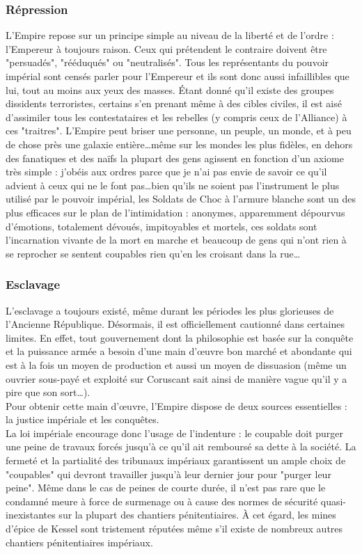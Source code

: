 \documentclass[twoside]{article}
\begin{document}
\subsubsection{Répression}
L'Empire repose sur un principe simple au niveau de la liberté et de l'ordre : l'Empereur à toujours raison. Ceux qui prétendent le contraire doivent être "persuadés", "rééduqués" ou "neutralisés". Tous les représentants du pouvoir impérial sont censés parler pour l'Empereur et ils sont donc aussi infaillibles que lui, tout au moins aux yeux des masses. Étant donné qu'il existe des groupes dissidents terroristes, certains s'en prenant même à des cibles civiles, il est aisé d'assimiler tous les contestataires et les rebelles (y compris ceux de l'Alliance) à ces "traitres". L'Empire peut briser une personne, un peuple, un monde, et à peu de chose près une galaxie entière\ldots même sur les mondes les plus fidèles, en dehors des fanatiques et des naïfs la plupart des gens agissent en fonction d'un axiome très simple : j'obéis aux ordres parce que je n'ai pas envie de savoir ce qu'il advient à ceux qui ne le font pas\ldots bien qu'ils ne soient pas l'instrument le plus utilisé par le pouvoir impérial,  les Soldats de Choc à l'armure blanche sont un des plus efficaces sur le plan de l'intimidation : anonymes, apparemment dépourvus d'émotions, totalement dévoués, impitoyables et mortels, ces soldats sont l'incarnation vivante de la mort en marche et beaucoup de gens qui n'ont rien à se reprocher se sentent coupables rien qu'en les croisant dans la rue\ldots

\subsubsection{Esclavage}
L'esclavage a toujours existé, même durant les périodes les plus glorieuses de l'Ancienne République. Désormais, il est officiellement cautionné dans certaines limites. En effet, tout gouvernement dont la philosophie est basée sur la conquête et la puissance armée a besoin d'une main d'\oe uvre bon marché et abondante qui est à la fois un moyen de production et aussi un moyen de dissuasion (même un ouvrier sous-payé et exploité sur Coruscant sait ainsi de manière vague qu'il y a pire que son sort\ldots).\\

Pour obtenir cette main d'\oe uvre, l'Empire dispose de deux sources essentielles : la justice impériale et les conquêtes.\\

La loi impériale encourage donc l'usage de l'indenture : le coupable doit purger une peine de travaux forcés jusqu'à ce qu'il ait remboursé sa dette à la société. La fermeté et la partialité des tribunaux impériaux garantissent un ample choix de "coupables" qui devront travailler jusqu'à leur dernier jour pour "purger leur peine". Même dans le cas de peines de courte durée, il n'est pas rare que le condamné meure à force de surmenage ou à cause des normes de sécurité quasi-inexistantes sur la plupart des chantiers pénitentiaires. À cet égard, les mines d'épice de Kessel sont tristement réputées même s'il existe de nombreux autres chantiers pénitentiaires impériaux.\\
\end{document}
